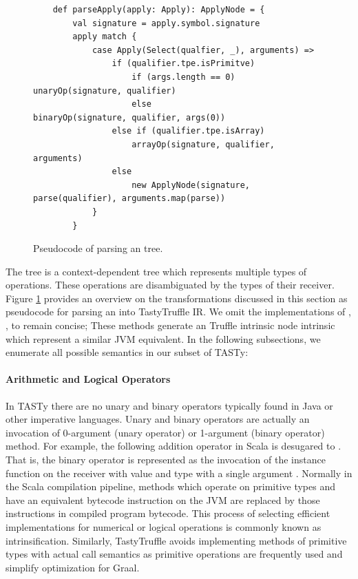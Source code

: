 \begin{figure}[!htb]
	\begin{verbatim}
	def parseApply(apply: Apply): ApplyNode = {
		val signature = apply.symbol.signature
		apply match {
			case Apply(Select(qualfier, _), arguments) => 
				if (qualifier.tpe.isPrimitve)
					if (args.length == 0) unaryOp(signature, qualifier)
					else                  binaryOp(signature, qualifier, args(0))
				else if (qualifier.tpe.isArray)
					arrayOp(signature, qualifier, arguments)
				else 
					new ApplyNode(signature, parse(qualifier), arguments.map(parse))	
			}
		}
	\end{verbatim}
	\caption{Pseudocode of parsing an  tree.}
	\label{impl:parse-apply}
\end{figure}
The  tree is a context-dependent tree which represents multiple types of operations.
These operations are disambiguated by the types of their receiver.
Figure \ref{impl:parse-apply} provides an overview on the transformations discussed in this section as pseudocode for parsing an  into TastyTruffle IR.
We omit the implementations of , ,  to remain concise; 
These methods generate an Truffle intrinsic node intrinsic which represent a similar JVM equivalent.
In the following subsections, we enumerate all possible semantics in our subset of TASTy:

\paragraph{Arithmetic and Logical Operators}

In TASTy there are no unary and binary operators typically found in Java or other imperative languages.
Unary and binary operators are actually an invocation of 0-argument (unary operator) or 1-argument (binary operator) method. 
For example, the following addition operator in Scala  is desugared to . 
That is, the binary operator \scalainline{+} is represented as the invocation of the instance function  on the receiver with value  and type  with a single argument .
Normally in the Scala compilation pipeline, methods which operate on primitive types and have an equivalent bytecode instruction on the JVM\cite{java:vm-spec} are replaced by those instructions in compiled program bytecode. 
This process of selecting efficient implementations for numerical or logical operations is commonly known as intrinsification.
Similarly, TastyTruffle avoids implementing methods of primitive types with actual call semantics as primitive operations are frequently used and simplify optimization for Graal.

